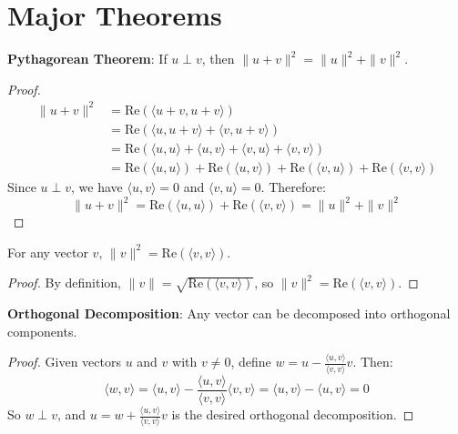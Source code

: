 \section{Major Theorems}

\begin{theorem}
  \label{theorem : pythagorean}
  \leanok
  \textbf{Pythagorean Theorem}: If $u \perp v$, then $\|u + v\|^2 = \|u\|^2 + \|v\|^2$.
\end{theorem}
\begin{proof}
  \begin{align}
  \|u + v\|^2 &= \text{Re}(\langle u + v, u + v \rangle) \\
  &= \text{Re}(\langle u, u + v \rangle + \langle v, u + v \rangle) \\
  &= \text{Re}(\langle u, u \rangle + \langle u, v \rangle + \langle v, u \rangle + \langle v, v \rangle) \\
  &= \text{Re}(\langle u, u \rangle) + \text{Re}(\langle u, v \rangle) + \text{Re}(\langle v, u \rangle) + \text{Re}(\langle v, v \rangle)
  \end{align}
  Since $u \perp v$, we have $\langle u, v \rangle = 0$ and $\langle v, u \rangle = 0$. Therefore:
  $$\|u + v\|^2 = \text{Re}(\langle u, u \rangle) + \text{Re}(\langle v, v \rangle) = \|u\|^2 + \|v\|^2$$
\end{proof}

\begin{theorem}
  \label{theorem : norm_sq_eq}
  \leanok
  For any vector $v$, $\|v\|^2 = \text{Re}(\langle v, v \rangle)$.
\end{theorem}
\begin{proof}
  By definition, $\|v\| = \sqrt{\text{Re}(\langle v, v \rangle)}$, so $\|v\|^2 = \text{Re}(\langle v, v \rangle)$.
\end{proof}

\begin{theorem}
  \label{theorem : ortho_decom}
  \leanok
  \textbf{Orthogonal Decomposition}: Any vector can be decomposed into orthogonal components.
\end{theorem}
\begin{proof}
  Given vectors $u$ and $v$ with $v \neq 0$, define $w = u - \frac{\langle u, v \rangle}{\langle v, v \rangle} v$. Then:
  $$\langle w, v \rangle = \langle u, v \rangle - \frac{\langle u, v \rangle}{\langle v, v \rangle} \langle v, v \rangle = \langle u, v \rangle - \langle u, v \rangle = 0$$
  So $w \perp v$, and $u = w + \frac{\langle u, v \rangle}{\langle v, v \rangle} v$ is the desired orthogonal decomposition.
\end{proof}


